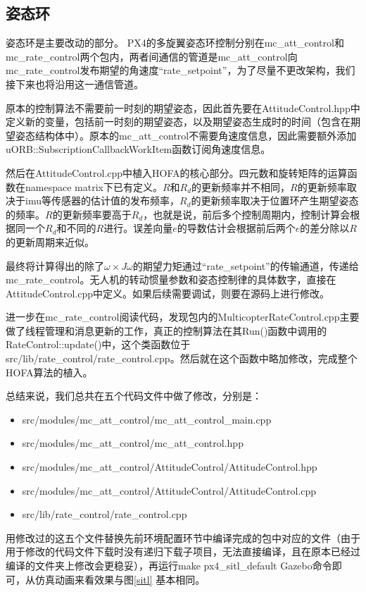 




\subsection*{姿态环}
姿态环是主要改动的部分。
PX4的多旋翼姿态环控制分别在mc\_att\_control和mc\_rate\_control两个包内，两者间通信的管道是mc\_att\_control向mc\_rate\_control发布期望的角速度“rate\_setpoint”，为了尽量不更改架构，我们接下来也将沿用这一通信管道。

原本的控制算法不需要前一时刻的期望姿态，因此首先要在AttitudeControl.hpp中定义新的变量，包括前一时刻的期望姿态，以及期望姿态生成时的时间（包含在期望姿态结构体中）。原本的mc\_att\_control不需要角速度信息，因此需要额外添加uORB::SubscriptionCallbackWorkItem函数订阅角速度信息。

然后在AttitudeControl.cpp中植入HOFA的核心部分。四元数和旋转矩阵的运算函数在namespace matrix下已有定义。$R$和$R_d$的更新频率并不相同，$R$的更新频率取决于imu等传感器的估计值的发布频率，$R_d$的更新频率取决于位置环产生期望姿态的频率。$R$的更新频率要高于$R_d$，也就是说，前后多个控制周期内，控制计算会根据同一个$R_d$和不同的$R$进行。误差向量$e$的导数估计会根据前后两个$e$的差分除以$R$的更新周期来近似。

最终将计算得出的除了$\omega \times J\omega$的期望力矩通过“rate\_setpoint”的传输通道，传递给mc\_rate\_control。无人机的转动惯量参数和姿态控制律的具体数字，直接在AttitudeControl.cpp中定义。如果后续需要调试，则要在源码上进行修改。

进一步在mc\_rate\_control阅读代码，发现包内的MulticopterRateControl.cpp主要做了线程管理和消息更新的工作，真正的控制算法在其Run()函数中调用的RateControl::update()中，这个类函数位于src/lib/rate\_control/rate\_control.cpp。然后就在这个函数中略加修改，完成整个HOFA算法的植入。

总结来说，我们总共在五个代码文件中做了修改，分别是：
\begin{itemize}
  \item src/modules/mc\_att\_control/mc\_att\_control\_main.cpp
  \item src/modules/mc\_att\_control/mc\_att\_control.hpp
  \item src/modules/mc\_att\_control/AttitudeControl/AttitudeControl.hpp
  \item src/modules/mc\_att\_control/AttitudeControl/AttitudeControl.cpp
  \item src/lib/rate\_control/rate\_control.cpp
\end{itemize}
用修改过的这五个文件替换先前环境配置环节中编译完成的包中对应的文件（由于用于修改的代码文件下载时没有递归下载子项目，无法直接编译，且在原本已经过编译的文件夹上修改会更稳妥），再运行make px4\_sitl\_default Gazebo命令即可，从仿真动画来看效果与图\ref{sitl} 基本相同。



